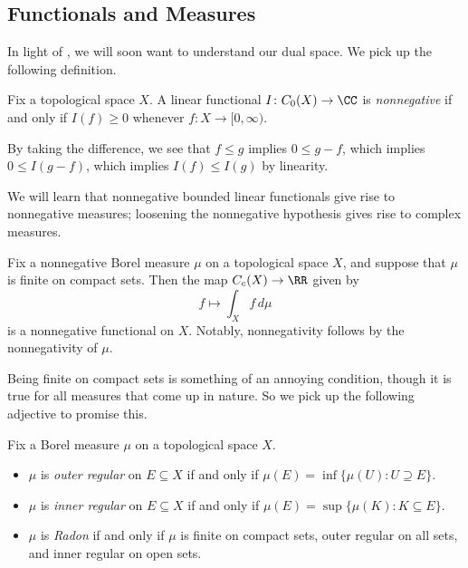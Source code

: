 \documentclass[../notes.tex]{subfiles}
\begin{document}
\subsection{Functionals and Measures}
In light of , we will soon want to understand our dual space. We pick up the following definition.
\begin{definition}[nonnegative]
	Fix a topological space $X$. A linear functional $I\colon C_0(X)\to\CC$ is \textit{nonnegative} if and only if $I(f)\ge0$ whenever $f\colon X\to[0,\infty)$.
\end{definition}
\begin{remark}
	By taking the difference, we see that $f\le g$ implies $0\le g-f$, which implies $0\le I(g-f)$, which implies $I(f)\le I(g)$ by linearity.
\end{remark}
We will learn that nonnegative bounded linear functionals give rise to nonnegative measures; loosening the nonnegative hypothesis gives rise to complex measures.
\begin{example}
	Fix a nonnegative Borel measure $\mu$ on a topological space $X$, and suppose that $\mu$ is finite on compact sets. Then the map $C_c(X)\to\RR$ given by
	\[f\mapsto\int_Xf\,d\mu\]
	is a nonnegative functional on $X$. Notably, nonnegativity follows by the nonnegativity of $\mu$.
\end{example}
Being finite on compact sets is something of an annoying condition, though it is true for all measures that come up in nature. So we pick up the following adjective to promise this.
\begin{defihelper}   
	Fix a Borel measure $\mu$ on a topological space $X$.
	\begin{itemize}
		\item $\mu$ is \textit{outer regular} on $E\subseteq X$ if and only if $\mu(E)=\inf\{\mu(U):U\supseteq E\}$.
		\item $\mu$ is \textit{inner regular} on $E\subseteq X$ if and only if $\mu(E)=\sup\{\mu(K):K\subseteq E\}$.
		\item $\mu$ is \textit{Radon} if and only if $\mu$ is finite on compact sets, outer regular on all sets, and inner regular on open sets.
	\end{itemize}
\end{defihelper}
\end{document}
